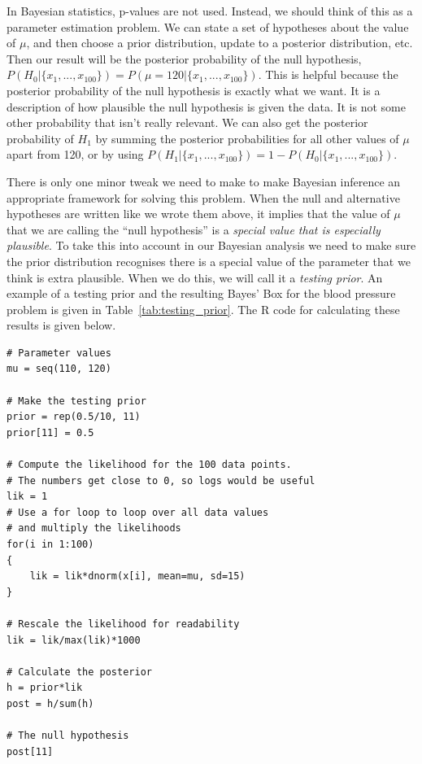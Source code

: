 In Bayesian statistics, p-values are not used. Instead, we should think of this
as a parameter estimation problem. We can state a set of hypotheses about the
value of $\mu$, and then choose a prior distribution, update to a posterior
distribution, etc. Then our result will be the posterior probability of the
null hypothesis, $P(H_0 | \{x_1, ..., x_{100}\}) = P(\mu = 120 | \{x_1, ..., x_{100}\})$.
This is helpful because the posterior probability of the null hypothesis is
exactly what we want. It is a description of how plausible the null hypothesis
is given the data. It is not some other probability that isn't really relevant.
We can also get the posterior probability of $H_1$ by summing the posterior
probabilities for all other values of $\mu$ apart from 120, or by using
$P(H_1 | \{x_1,...,x_{100}\}) = 1 - P(H_0 | \{x_1,...,x_{100}\})$.

There is only one minor tweak we need to make to make Bayesian inference an
appropriate framework for solving this problem. When the null and alternative
hypotheses are written like we wrote them above, it implies that the value of $\mu$
that we are calling the ``null hypothesis'' is a {\it special value that is
especially plausible}. To take this into account in our Bayesian analysis we
need to make sure the prior distribution recognises there is a special
value of the parameter that we think is extra plausible. When we do this, we
will call it a {\it testing prior}. An example of a testing prior and the
resulting Bayes' Box for
the blood pressure problem is given in Table~\ref{tab:testing_prior}.
The R code for calculating these results is given below.

\begin{verbatim}
# Parameter values
mu = seq(110, 120)

# Make the testing prior
prior = rep(0.5/10, 11)
prior[11] = 0.5

# Compute the likelihood for the 100 data points.
# The numbers get close to 0, so logs would be useful
lik = 1
# Use a for loop to loop over all data values
# and multiply the likelihoods
for(i in 1:100)
{
    lik = lik*dnorm(x[i], mean=mu, sd=15)
}

# Rescale the likelihood for readability
lik = lik/max(lik)*1000

# Calculate the posterior
h = prior*lik
post = h/sum(h)

# The null hypothesis
post[11]
\end{verbatim}


